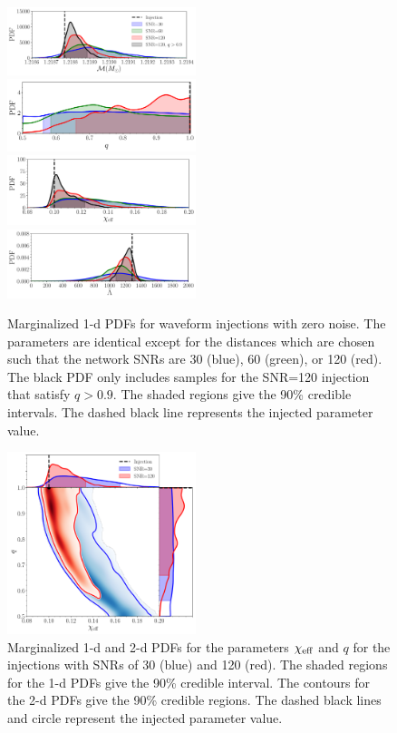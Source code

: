 \documentclass[prd,aps,letter,twocolumn,floatfix,notitlepage,nofootinbib]{revtex4-1}
\begin{document}
\begin{figure}[htb]
\centering
\includegraphics[width=0.49\textwidth]{chirpmass.pdf}\\
\includegraphics[width=0.49\textwidth]{q.pdf}\\
\includegraphics[width=0.49\textwidth]{chieff.pdf}\\
\includegraphics[width=0.49\textwidth]{tildelambda.pdf}
\caption{Marginalized 1-d PDFs for waveform injections with zero noise. The parameters are identical except for the distances which are chosen such that the network SNRs are 30 (blue), 60 (green), or 120 (red). The black PDF only includes samples for the SNR=120 injection that satisfy $q>0.9$. The shaded regions give the 90\% credible intervals. The dashed black line represents the injected parameter value.}
\label{fig:1dpe}
\end{figure}

\begin{figure}[htb]
\centering
\includegraphics[width=0.49\textwidth]{chieff_q.pdf}
\caption{Marginalized 1-d and 2-d PDFs for the parameters $\chi_{\rm eff}$ and $q$ for the injections with SNRs of 30 (blue) and 120 (red). The shaded regions for the 1-d PDFs give the 90\% credible interval. The contours for the 2-d PDFs give the 90\% credible regions. The dashed black lines and circle represent the injected parameter value.}
\label{fig:2dpe}
\end{figure}
\end{document}
